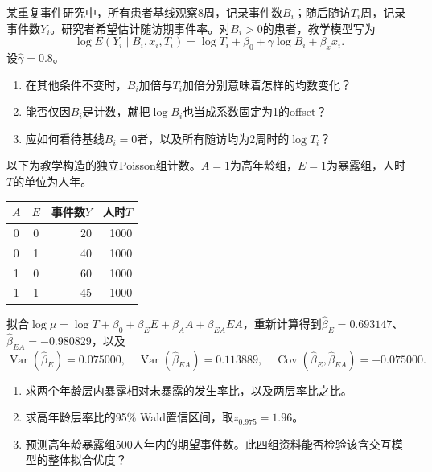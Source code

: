某重复事件研究中，所有患者基线观察8周，记录事件数$B_i$；随后随访$T_i$周，记录事件数$Y_i$。研究者希望估计随访期事件率。对$B_i>0$的患者，教学模型写为\[\log E(Y_i\mid B_i,x_i,T_i)=\log T_i+\beta_0+\gamma\log B_i+\beta_xx_i.\]设$\widehat\gamma=0.8$。\begin{enumerate}\item 在其他条件不变时，$B_i$加倍与$T_i$加倍分别意味着怎样的均数变化？\item 能否仅因$B_i$是计数，就把$\log B_i$也当成系数固定为1的offset？\item 应如何看待基线$B_i=0$者，以及所有随访均为2周时的$\log T_i$？\end{enumerate}

以下为教学构造的独立Poisson组计数。$A=1$为高年龄组，$E=1$为暴露组，人时$T$的单位为人年。\begin{center}\small\begin{tabular}{@{}ccrr@{}}\toprule $A$ & $E$ & 事件数$Y$ & 人时$T$\\\midrule 0&0&20&1000\\0&1&40&1000\\1&0&60&1000\\1&1&45&1000\\\bottomrule\end{tabular}\end{center}拟合$\log\mu=\log T+\beta_0+\beta_EE+\beta_AA+\beta_{EA}EA$，重新计算得到$\widehat\beta_E=0.693147$、$\widehat\beta_{EA}=-0.980829$，以及\[\operatorname{Var}(\widehat\beta_E)=0.075000,\quad\operatorname{Var}(\widehat\beta_{EA})=0.113889,\quad\operatorname{Cov}(\widehat\beta_E,\widehat\beta_{EA})=-0.075000.\]\begin{enumerate}\item 求两个年龄层内暴露相对未暴露的发生率比，以及两层率比之比。\item 求高年龄层率比的95\% Wald置信区间，取$z_{0.975}=1.96$。\item 预测高年龄暴露组500人年内的期望事件数。此四组资料能否检验该含交互模型的整体拟合优度？\end{enumerate}

